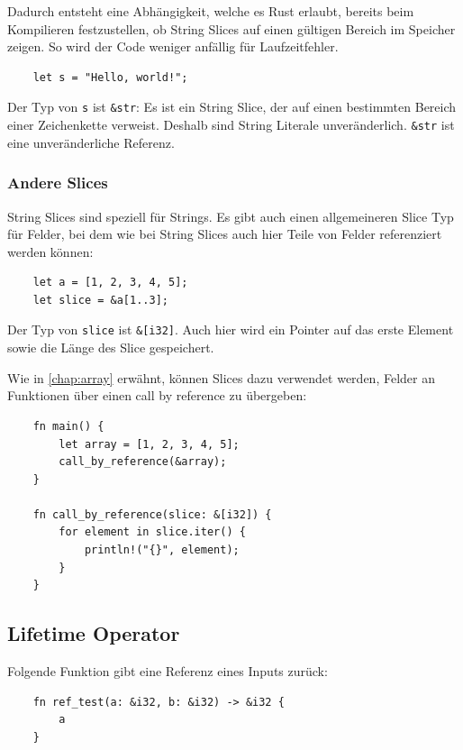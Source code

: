 Dadurch entsteht eine Abhängigkeit, welche es Rust erlaubt, bereits beim Kompilieren festzustellen, ob String Slices auf einen gültigen Bereich im Speicher zeigen. So wird der Code weniger anfällig für Laufzeitfehler.

\begin{lstlisting}
    let s = "Hello, world!";
\end{lstlisting}

Der Typ von \verb"s" ist \verb"&str": Es ist ein String Slice, der auf einen bestimmten Bereich einer Zeichenkette verweist. Deshalb sind String Literale unveränderlich. \verb"&str" ist eine unveränderliche Referenz.

\subsubsection{Andere Slices}

String Slices sind speziell für Strings. Es gibt auch einen allgemeineren Slice Typ für Felder, bei dem wie bei String Slices auch hier Teile von Felder referenziert werden können:

\begin{lstlisting}
    let a = [1, 2, 3, 4, 5];
    let slice = &a[1..3];
\end{lstlisting}

Der Typ von \verb"slice" ist \verb"&[i32]". Auch hier wird ein Pointer auf das erste Element sowie die Länge des Slice gespeichert.

Wie in \autoref{chap:array} erwähnt, können Slices dazu verwendet werden, Felder an Funktionen über einen \glqq call by reference\grqq{} zu übergeben:

\begin{lstlisting}
    fn main() {
        let array = [1, 2, 3, 4, 5];
        call_by_reference(&array);
    }
    
    fn call_by_reference(slice: &[i32]) {
        for element in slice.iter() {
            println!("{}", element);
        }
    }
\end{lstlisting}

\subsection{Lifetime Operator}

Folgende Funktion gibt eine Referenz eines Inputs zurück:

\begin{lstlisting}
    fn ref_test(a: &i32, b: &i32) -> &i32 {
        a
    }
\end{lstlisting}

